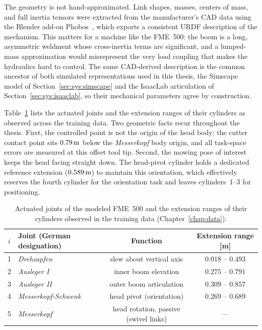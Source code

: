 The geometry is not hand-approximated. Link shapes, masses, centers of
mass, and full inertia tensors were extracted from the manufacturer's
CAD data using the Blender add-on
Phobos~\cite{vonszadkowski2020phobos}, which exports a consistent URDF
description of the mechanism. This matters for a machine like the
FME~500: the boom is a long, asymmetric weldment whose cross-inertia
terms are significant, and a lumped-mass approximation would
misrepresent the very load coupling that makes the hydraulics hard to
control. The same CAD-derived description is the common ancestor of
both simulated representations used in this thesis, the Simscape model
of Section~\ref{sec:sys:simscape} and the IsaacLab articulation of
Section~\ref{sec:sys:isaaclab}, so their mechanical parameters agree by
construction.

Table~\ref{tab:sys:cylinders} lists the actuated joints and the
extension ranges of their cylinders as observed across the training
data. Two geometric facts recur throughout the thesis. First, the
controlled point is not the origin of the head body: the cutter contact
point sits $\unit[0.79]{m}$ below the \emph{Messerkopf} body origin,
and all task-space errors are measured at this offset tool tip. Second,
the mowing pose of interest keeps the head facing straight down. The
head-pivot cylinder holds a dedicated reference extension
($\unit[0.589]{m}$) to maintain this orientation, which effectively
reserves the fourth cylinder for the orientation task and leaves
cylinders~1--3 for positioning.

\begin{table}[tb]
  \centering
  \caption{Actuated joints of the modeled FME~500 and the extension
  ranges of their cylinders observed in the training data
  (Chapter~\ref{chap:data}).}
  \label{tab:sys:cylinders}
  \begin{tabular}{clcc}
    \toprule
    $i$ & Joint (German designation) & Function & Extension range [m] \\
    \midrule
    1 & \emph{Drehzapfen}         & slew about vertical axis & $0.018$ -- $0.493$ \\
    2 & \emph{Ausleger I}         & inner boom elevation     & $0.275$ -- $0.791$ \\
    3 & \emph{Ausleger II}        & outer boom articulation  & $0.309$ -- $0.857$ \\
    4 & \emph{Messerkopf-Schwenk} & head pivot (orientation) & $0.269$ -- $0.689$ \\
    \midrule
    5 & \emph{Messerkopf}         & head rotation, passive (swivel links) & --- \\
    \bottomrule
  \end{tabular}
\end{table}

